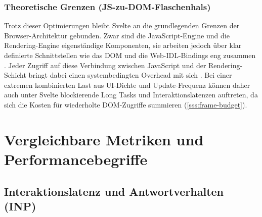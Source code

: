 \subsubsection{Theoretische Grenzen (JS-zu-DOM-Flaschenhals)}
\label{sss:theoretical-limitations}

Trotz dieser Optimierungen bleibt Svelte an die grundlegenden Grenzen der Browser-Architektur gebunden. Zwar sind die JavaScript-Engine und die Rendering-Engine eigenständige Komponenten, sie arbeiten jedoch über klar definierte Schnittstellen wie das DOM und die Web-IDL-Bindings eng zusammen \cite{mdn-javascript_engine}. Jeder Zugriff auf diese Verbindung zwischen JavaScript und der Rendering-Schicht bringt dabei einen systembedingten Overhead mit sich \cite{chromium-blink_faq}. Bei einer extremen kombinierten Last aus UI-Dichte und Update-Frequenz können daher auch unter Svelte blockierende Long Tasks und Interaktionslatenzen auftreten, da sich die Kosten für wiederholte DOM-Zugriffe summieren (\cref{sss:frame-budget}).

\section{Vergleichbare Metriken und Performancebegriffe}
\label{s:metrics}

\subsection{Interaktionslatenz und Antwortverhalten (INP)}
\label{ss:inp}

